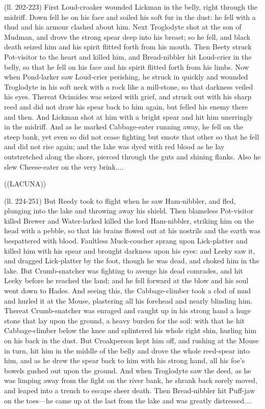 (ll. 202-223) First Loud-croaker wounded Lickman in the belly, right through
the midriff. Down fell he on his face and soiled his soft fur in the dust: he
fell with a thud and his armour clashed about him. Next Troglodyte shot at the
son of Mudman, and drove the strong spear deep into his breast; so he fell, and
black death seized him and his spirit flitted forth from his mouth. Then Beety
struck Pot-visitor to the heart and killed him, and Bread-nibbler hit
Loud-crier in the belly, so that he fell on his face and his spirit flitted
forth from his limbs. Now when Pond-larker saw Loud-crier perishing, he struck
in quickly and wounded Troglodyte in his soft neck with a rock like a
mill-stone, so that darkness veiled his eyes. Thereat Ocimides was seized with
grief, and struck out with his sharp reed and did not draw his spear back to
him again, but felled his enemy there and then. And Lickman shot at him with a
bright spear and hit him unerringly in the midriff. And as he marked
Cabbage-eater running away, he fell on the steep bank, yet even so did not
cease fighting but smote that other so that he fell and did not rise again; and
the lake was dyed with red blood as he lay outstretched along the shore,
pierced through the guts and shining flanks. Also he slew Cheese-eater on the
very brink....

((LACUNA))

(ll. 224-251) But Reedy took to flight when he saw Ham-nibbler, and fled,
plunging into the lake and throwing away his shield. Then blameless Pot-visitor
killed Brewer and Water-larked killed the lord Ham-nibbler, striking him on the
head with a pebble, so that his brains flowed out at his nostrils and the earth
was bespattered with blood. Faultless Muck-coucher sprang upon Lick-platter and
killed him with his spear and brought darkness upon his eyes: and Leeky saw it,
and dragged Lick-platter by the foot, though he was dead, and choked him in the
lake. But Crumb-snatcher was fighting to avenge his dead comrades, and hit
Leeky before he reached the land; and he fell forward at the blow and his soul
went down to Hades. And seeing this, the Cabbage-climber took a clod of mud and
hurled it at the Mouse, plastering all his forehead and nearly blinding him.
Thereat Crumb-snatcher was enraged and caught up in his strong hand a huge
stone that lay upon the ground, a heavy burden for the soil: with that he hit
Cabbage-climber below the knee and splintered his whole right shin, hurling him
on his back in the dust. But Croakperson kept him off, and rushing at the Mouse
in turn, hit him in the middle of the belly and drove the whole reed-spear into
him, and as he drew the spear back to him with his strong hand, all his
foe’s bowels gushed out upon the ground. And when Troglodyte saw the
deed, as he was limping away from the fight on the river bank, he shrank back
sorely moved, and leaped into a trench to escape sheer death. Then
Bread-nibbler hit Puff-jaw on the toes—he came up at the last from the
lake and was greatly distressed....

